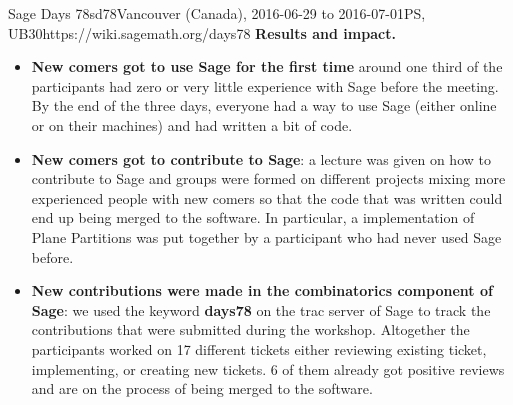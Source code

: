 \begin{event}{Sage Days 78}{sd78}{Vancouver (Canada), 2016-06-29 to 2016-07-01}{PS, UB}{30}{https://wiki.sagemath.org/days78}
\textbf{Results and impact.} 
\begin{itemize}
\item \textbf{New comers got to use Sage for the first time} around one
third of the participants had zero or very little experience with Sage before the meeting. By the
end of the three days, everyone had a way to use Sage (either online or on their machines)
and had written a bit of code.
\item \textbf{New comers got to contribute to Sage}: a lecture was given on how to contribute to Sage
and groups were formed on different projects mixing more experienced people with new comers so
that the code that was written could end up being merged to the software. In particular, a implementation
of Plane Partitions was put together by a participant who had never used Sage before.
\item \textbf{New contributions were made in the combinatorics component of Sage}: we used the keyword
\textbf{days78} on the trac server of Sage to track the contributions that were submitted during the workshop.
 Altogether the participants
worked on 17 different tickets either reviewing
existing ticket, implementing, or creating new tickets. 6 of them already got positive reviews and are
on the process of being merged to the software.
\end{itemize}


\end{event}
